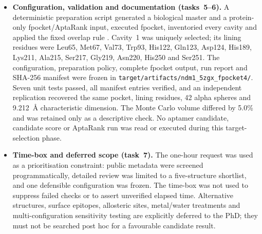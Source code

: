 \begin{itemize}
  \item \textbf{Configuration, validation and documentation (tasks~5--6).}
  A deterministic preparation script generated a biological master and a
  protein-only fpocket/AptaRank input, executed fpocket, inventoried every
  cavity and applied the fixed overlap rule \cite{le_guilloux_fpocket_2009}.
  Cavity~1 was uniquely selected; its lining residues were Leu65, Met67, Val73,
  Trp93, His122, Gln123, Asp124, His189, Lys211, Ala215, Ser217, Gly219,
  Asn220, His250 and Ser251.  The configuration, preparation policy, complete
  fpocket output, run report and SHA-256 manifest were frozen in
  \texttt{target/artifacts/ndm1\_5zgx\_fpocket4/}.  Seven unit tests passed, all
  manifest entries verified, and an independent replication recovered the same
  pocket, lining residues, 42 alpha spheres and 9.212~\AA{} characteristic
  dimension.  The Monte Carlo volume differed by 5.0\% and was retained only as
  a descriptive check.  No aptamer candidate, candidate score or AptaRank run
  was read or executed during this target-selection phase.

  \item \textbf{Time-box and deferred scope (task~7).}  The one-hour request
  was used as a prioritisation constraint: public metadata were screened
  programmatically, detailed review was limited to a five-structure shortlist,
  and one defensible configuration was frozen.  The time-box was not used to
  suppress failed checks or to assert unverified elapsed time.  Alternative
  structures, surface epitopes, allosteric sites, metal/water treatments and
  multi-configuration sensitivity testing are explicitly deferred to the PhD;
  they must not be searched post hoc for a favourable candidate result.


\end{itemize}
